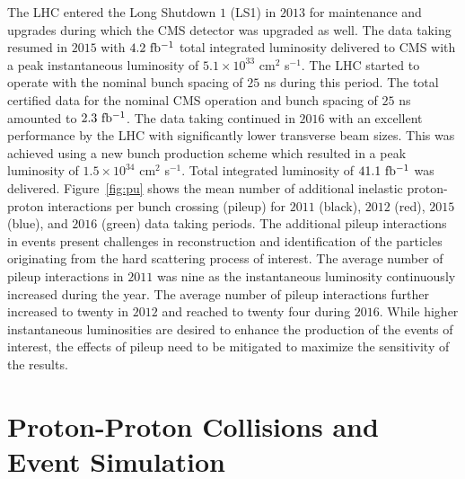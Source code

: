 The LHC entered the Long Shutdown $1$ (LS1) in $2013$ for maintenance and upgrades during which the CMS detector was upgraded as well. The data taking resumed in $2015$ with $4.2~\mathrm{fb^{-1}}$ total integrated luminosity delivered to CMS with a peak instantaneous luminosity of $5.1 \times 10^{33}$ cm$^2$ s$^{-1}$. The LHC started to operate with the nominal bunch spacing of $25$ ns during this period. The total certified data for the nominal CMS operation and bunch spacing of $25$ ns amounted to $2.3~\mathrm{fb^{-1}}$. The data taking continued in $2016$ with an excellent performance by the LHC with significantly lower transverse beam sizes. This was achieved using a new bunch production scheme which resulted in a peak luminosity of  $1.5 \times 10^{34}$ cm$^2$ s$^{-1}$. Total integrated luminosity of $41.1~\mathrm{fb^{-1}}$ was delivered. Figure~\ref{fig:pu} shows the mean number of additional inelastic proton-proton interactions per bunch crossing (pileup) for $2011$ (black), $2012$ (red), $2015$ (blue), and $2016$ (green) data taking periods. The additional pileup interactions in events present challenges in reconstruction and identification of the particles originating from the hard scattering process of interest. The average number of pileup interactions in $2011$ was nine as the instantaneous luminosity continuously increased during the year. The average number of pileup interactions further increased to twenty in $2012$ and reached to twenty four during $2016$.  While higher instantaneous luminosities are desired to enhance the production of the events of interest, the effects of pileup need to be mitigated to maximize the sensitivity of the results. 

\section{Proton-Proton Collisions and Event Simulation}


